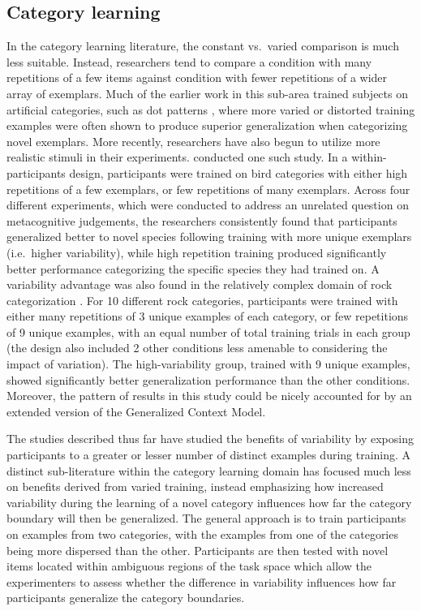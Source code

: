 \documentclass[
  12pt,
  letterpaper,
]{article}
\begin{document}
\subsection{Category learning}\label{category-learning}

In the category learning literature, the constant vs.~varied comparison
is much less suitable. Instead, researchers tend to compare a condition
with many repetitions of a few items against condition with fewer
repetitions of a wider array of exemplars. Much of the earlier work in
this sub-area trained subjects on artificial categories, such as dot
patterns
\autocite{homaCategoryBreadthAbstraction1976,posnerGenesisAbstractIdeas1968},
where more varied or distorted training examples were often shown to
produce superior generalization when categorizing novel exemplars. More
recently, researchers have also begun to utilize more realistic stimuli
in their experiments.
\textcite{wahlheimMetacognitiveJudgmentsRepetition2012} conducted one
such study. In a within-participants design, participants were trained
on bird categories with either high repetitions of a few exemplars, or
few repetitions of many exemplars. Across four different experiments,
which were conducted to address an unrelated question on metacognitive
judgements, the researchers consistently found that participants
generalized better to novel species following training with more unique
exemplars (i.e.~higher variability), while high repetition training
produced significantly better performance categorizing the specific
species they had trained on. A variability advantage was also found in
the relatively complex domain of rock categorization
\autocite{nosofskyTestsExemplarmemoryModel2018}. For 10 different rock
categories, participants were trained with either many repetitions of 3
unique examples of each category, or few repetitions of 9 unique
examples, with an equal number of total training trials in each group
(the design also included 2 other conditions less amenable to
considering the impact of variation). The high-variability group,
trained with 9 unique examples, showed significantly better
generalization performance than the other conditions. Moreover, the
pattern of results in this study could be nicely accounted for by an
extended version of the Generalized Context Model.

The studies described thus far have studied the benefits of variability
by exposing participants to a greater or lesser number of distinct
examples during training. A distinct sub-literature within the category
learning domain has focused much less on benefits derived from varied
training, instead emphasizing how increased variability during the
learning of a novel category influences how far the category boundary
will then be generalized. The general approach is to train participants
on examples from two categories, with the examples from one of the
categories being more dispersed than the other. Participants are then
tested with novel items located within ambiguous regions of the task
space which allow the experimenters to assess whether the difference in
variability influences how far participants generalize the category
boundaries.
\end{document}
